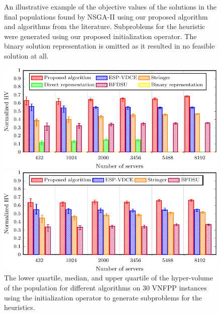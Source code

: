 \begin{enumerate}
\begin{figure}[t!]
                  \vspace{1em}
                  \caption{An illustrative example of the objective values of the solutions in the final populations found by NSGA-II using our proposed algorithm and algorithms from the literature. Subproblems for the heuristic were generated using our proposed initialization operator. The binary solution representation is omitted as it resulted in no feasible solution at all.}
                  \label{fig:alg_objectives}
            \end{figure}
            \begin{figure}
                  \centering
                  \hfill
                  \begin{minipage}[t]{.48\textwidth}
                        \centering
                        \includegraphics[width=\columnwidth]{figs/comparison/comparison-crop}
                        \caption{The lower quartile, median, and upper quartile of the hyper-volume of the population for different algorithms on 30 VNFPP instances using the initialization operator to generate subproblems for the heuristics.}
                        \label{fig:alg_comparison}
                  \end{minipage}\hfill
                  \begin{minipage}[t]{.48\textwidth}
                        \centering
                        \includegraphics[width=\columnwidth]{figs/comparison/alg_fixed-crop}

\end{minipage}
\end{figure}
\end{enumerate}
